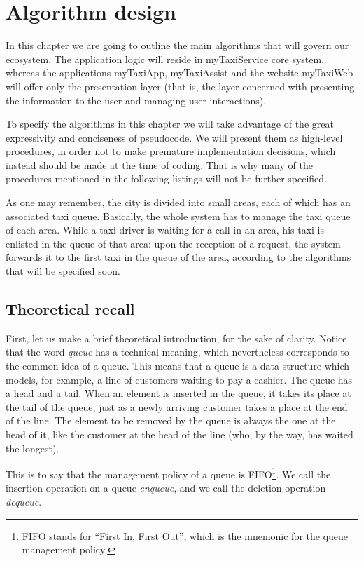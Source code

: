 \chapter{Algorithm design} \label{chap:algorithm}
In this chapter we are going to outline the main algorithms that will govern our ecosystem. The application logic will reside in myTaxiService core system, whereas the applications myTaxiApp, myTaxiAssist and the website myTaxiWeb will offer only the presentation layer (that is, the layer concerned with presenting the information to the user and managing user interactions). 

To specify the algorithms in this chapter we will take advantage of the great expressivity and conciseness of pseudocode. We will present them as \mbox{high-level} procedures, in order not to make premature implementation decisions, which instead should be made at the time of coding. That is why many of the procedures mentioned in the following listings will not be further specified.

As one may remember, the city is divided into small areas, each of which has an associated taxi queue. Basically, the whole system has to manage the taxi queue of each area. While a taxi driver is waiting for a call in an area, his taxi is enlisted in the queue of that area: upon the reception of a request, the system forwards it to the first taxi in the queue of the area, according to the algorithms that will be specified soon.


\section{Theoretical recall}
First, let us make a brief theoretical introduction, for the sake of clarity. Notice that the word \emph{queue} has a technical meaning, which nevertheless corresponds to the common idea of a queue. This means that a queue is a data structure which models, for example, a line of customers waiting to pay a cashier. The queue has a head and a tail. When an element is inserted in the queue, it takes its place at the tail of the queue, just as a newly arriving customer takes a place at the end of the line. The element to be removed by the queue is always the one at the head of it, like the customer at the head of the line (who, by the way, has waited the longest).

This is to say that the management policy of a queue is FIFO\footnote{FIFO stands for ``First In, First Out'', which is the mnemonic for the queue management policy.}. We call the insertion operation on a queue \emph{enqueue}, and we call the deletion operation \emph{dequeue}.

